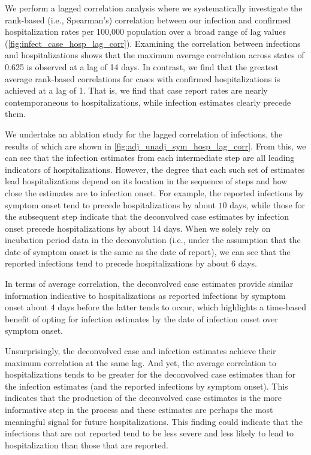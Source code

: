 \documentclass{article}
\begin{document}
We perform a lagged correlation analysis where we systematically investigate the
rank-based (i.e., Spearman's) correlation between our infection and confirmed
hospitalization rates per 100,000 population over a broad range of lag values
(\autoref{fig:infect_case_hosp_lag_corr}). Examining the correlation between infections and
hospitalizations shows that the maximum average correlation across states of 0.625 is 
observed at a lag of 14 days. In contrast, we find that the greatest average
rank-based correlations for cases with confirmed hospitalizations is achieved at a lag of
1. That is, we find that case report rates are nearly contemporaneous to
hospitalizations, while infection estimates clearly precede them. 

We undertake an ablation study for the lagged correlation of infections, the results of which 
are shown in \autoref{fig:adj_unadj_sym_hosp_lag_corr}. From this, we can see that the 
infection estimates from each intermediate 
step are all leading indicators of hospitalizations. However, the degree that each such set of estimates
lead hospitalizations depend on its location in the sequence of steps and how close the estimates 
are to infection onset. For example, 
the reported infections by symptom onset tend to precede hospitalizations by about $10$
days, while those for the subsequent step indicate that the deconvolved case estimates by infection onset
precede hospitalizations by about $14$ days. When we solely rely on incubation period data 
in the deconvolution (i.e., under the assumption that the date of symptom
onset is the same as the date of report), we can see that the reported infections tend to precede
hospitalizations by about $6$ days. 

In terms of average correlation, the deconvolved case estimates provide similar
information indicative to hospitalizations as reported infections by symptom onset
about $4$ days before the latter tends to occur, which highlights a time-based benefit of opting for
infection estimates by the date of infection onset over symptom onset. 

Unsurprisingly, the deconvolved case and infection estimates achieve their maximum correlation
at the same lag. And yet, the average correlation to hospitalizations
tends to be greater for the deconvolved case estimates than for the infection estimates (and
the reported infections by symptom onset). This indicates that the production of the deconvolved case
estimates is the more informative step in the process and
these estimates are perhaps the most meaningful signal for future hospitalizations.
This finding could indicate that the infections that 
are not reported tend to be less severe and less likely to lead to hospitalization than those 
that are reported.
\end{document}
